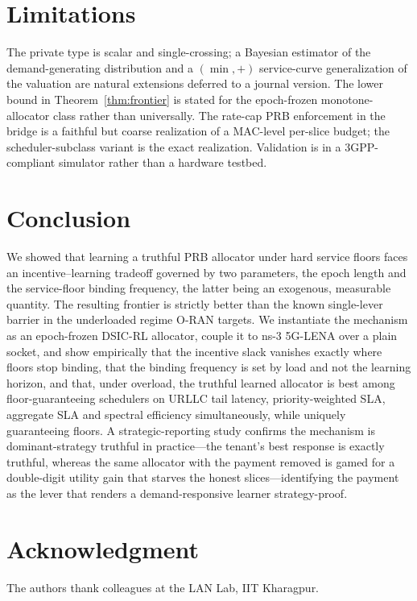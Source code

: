 \documentclass[conference]{IEEEtran}
\theoremstyle{definition}
\theoremstyle{remark}
\begin{document}
\section{Limitations}\label{sec:limits}
The private type is scalar and single-crossing; a Bayesian estimator of the demand-generating distribution and a $(\min,+)$ service-curve generalization of the valuation are natural extensions deferred to a journal version. The lower bound in Theorem~\ref{thm:frontier} is stated for the epoch-frozen monotone-allocator class rather than universally. The rate-cap PRB enforcement in the bridge is a faithful but coarse realization of a MAC-level per-slice budget; the scheduler-subclass variant is the exact realization. Validation is in a 3GPP-compliant simulator rather than a hardware testbed.

\section{Conclusion}\label{sec:concl}
We showed that learning a truthful PRB allocator under hard service floors faces an incentive--learning tradeoff governed by two parameters, the epoch length and the service-floor binding frequency, the latter being an exogenous, measurable quantity. The resulting frontier is strictly better than the known single-lever barrier in the underloaded regime O-RAN targets. We instantiate the mechanism as an epoch-frozen DSIC-RL allocator, couple it to ns-3 5G-LENA over a plain socket, and show empirically that the incentive slack vanishes exactly where floors stop binding, that the binding frequency is set by load and not the learning horizon, and that, under overload, the truthful learned allocator is best among floor-guaranteeing schedulers on URLLC tail latency, priority-weighted SLA, aggregate SLA and spectral efficiency simultaneously, while uniquely guaranteeing floors. A strategic-reporting study confirms the mechanism is dominant-strategy truthful in practice---the tenant's best response is exactly truthful, whereas the same allocator with the payment removed is gamed for a double-digit utility gain that starves the honest slices---identifying the payment as the lever that renders a demand-responsive learner strategy-proof.

\section*{Acknowledgment}
The authors thank colleagues at the LAN Lab, IIT Kharagpur.
\end{document}
